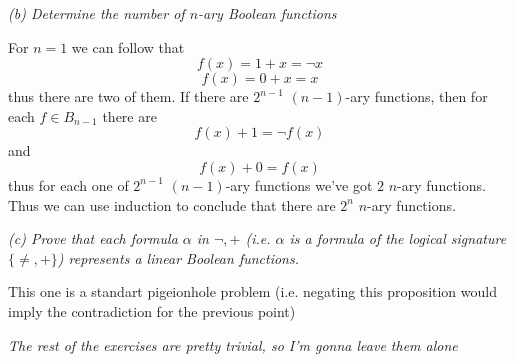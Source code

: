 \documentclass[11pt,oneside,titlepage]{book}
\newcommand{\set}[1]{\{ #1 \}}
\begin{document}
\textit{(b) Determine the number of $n$-ary Boolean functions}

For $n = 1$ we can follow that
$$f(x) = 1 + x = \neg x$$
$$f(x) = 0 + x = x$$
thus there are two of them. If there are $2^{n - 1}$ $(n-1)$-ary functions, then for each
$f \in B_{n - 1}$ there are
$$f(x) + 1 = \neg f(x)$$
and
$$f(x) + 0 =  f(x)$$
thus for each one of $2^{n - 1}$ $(n-1)$-ary functions we've got $2$ $n$-ary functions. Thus
we can use induction to conclude that there are $2^n$ $n$-ary functions.

\textit{(c) Prove that each formula $\alpha$ in $\neg, +$ (i.e. $\alpha$ is a formula of the
  logical signature $\set{\neq, +}$) represents a linear Boolean functions.}

This one is a standart pigeionhole problem (i.e. negating this proposition would imply the
contradiction for the previous point)

\textit{The rest of the exercises are pretty trivial, so I'm gonna leave them alone}
\end{document}
